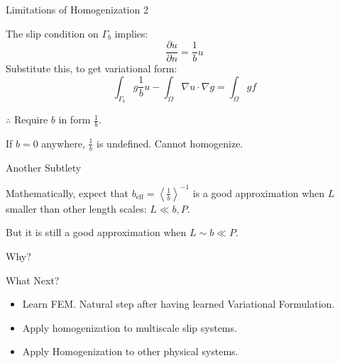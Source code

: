 \documentclass{beamer}
\newcommand{\beff}{\ensuremath{b_{\mathrm{eff}}}}
\begin{document}
\begin{frame}{Limitations of Homogenization 2}

The slip condition on $\Gamma_b$ implies:
\begin{equation}
\frac{\partial u}{\partial n} = \frac{1}{b}u
\end{equation}
Substitute this, to get variational form:
\begin{equation}
\int_{\Gamma_b} g \frac{1}{b} u 
 - \int_{\Omega} \nabla u \cdot \nabla g  
= \int_{\Omega} g f
\end{equation}


$\therefore$ Require $b$ in form $\displaystyle \frac{1}{b}$.

\vspace{1em}
If $b=0$ anywhere, $\frac{1}{b}$ is undefined. \phantom{word}Cannot homogenize.

\end{frame}


\begin{frame}{Another Subtlety}

Mathematically, expect that  $\beff = \left< \frac{1}{b} \right>^{-1}$ is a good approximation when $L$ smaller than other length scales: $L \ll b, P$.

\vspace{1em}
But it is still a good approximation when $L \sim b \ll P$.

\vspace{1em}
Why?

\vspace{1em}

\end{frame}


\begin{frame}{What Next?}
\begin{itemize}
\item Learn FEM.  Natural step after having learned Variational Formulation.
\item Apply homogenization to multiscale slip systems.
\item Apply Homogenization to other physical systems.
\end{itemize}

\end{frame}
\end{document}
